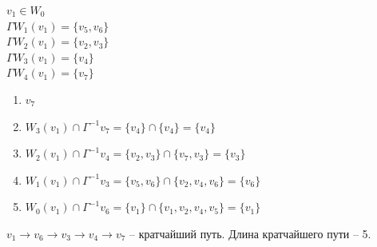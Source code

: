 \documentclass[12pt,a4paper]{article}
\begin{document}
$v_1 \in W_0$ \\ 
$\Gamma W_1(v_1) = \{ v_5, v_6 \}$ \\
$\Gamma W_2(v_1) = \{ v_2, v_3 \}$ \\
$\Gamma W_3(v_1) = \{ v_4 \}$ \\
$\Gamma W_4(v_1) = \{ v_7 \}$
\begin{enumerate}[leftmargin=*]
   \item $v_7$
   \item $W_3(v_1) \cap \Gamma^{-1}v_7 = \{ v_4 \} \cap \{ v_4 \} = \{ v_4 \}$
   \item $W_2(v_1) \cap \Gamma^{-1}v_4 = \{ v_2, v_3 \} \cap \{ v_7, v_3 \} = \{ v_3 \}$
   \item $W_1(v_1) \cap \Gamma^{-1}v_3 = \{ v_5, v_6 \} \cap \{ v_2, v_4, v_6 \} = \{ v_6 \}$
   \item $W_0(v_1) \cap \Gamma^{-1}v_6 = \{ v_1 \} \cap \{ v_1, v_2, v_4, v_5 \} = \{ v_1 \}$
\end{enumerate}
$v_1 \to v_6 \to v_3 \to v_4 \to v_7$ -- кратчайший путь. Длина кратчайшего пути -- 5.


\end{document}
